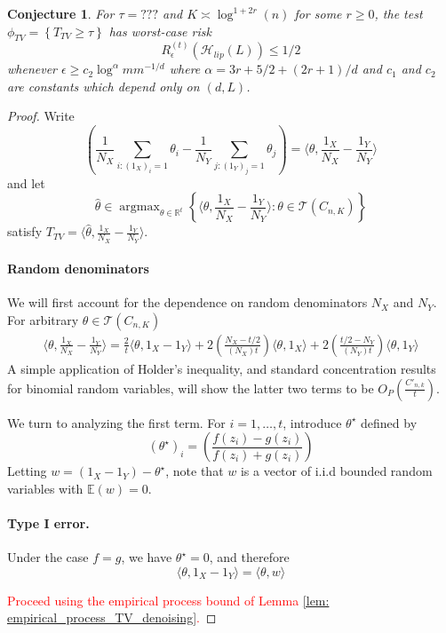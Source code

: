 \documentclass{article}
\newcommand{\Reals}{\mathbb{R}}
\newcommand{\set}[1]{\left\{#1\right\}}
\newcommand{\dotp}[2]{\langle #1, #2 \rangle}
\newcommand{\1}{\mathbb{I}}
\DeclareMathOperator*{\argmax}{argmax}
\newcommand{\Hclass}{\mathcal{H}}
\newcommand{\Ebb}{\mathbb{E}}
\theoremstyle{alden}
\theoremstyle{aldenthm}
\newtheorem{conjecture}{Conjecture}
\theoremstyle{definition}
\theoremstyle{remark}
\begin{document}
\begin{conjecture}
	For $\tau = ???$ and $K \asymp \log^{1 + 2r}(n)$ for some $r \geq 0$, the test $\phi_{TV} = \set{T_{TV} \geq \tau}$ has worst-case risk
	\begin{equation*}
	R_{\epsilon}^{(t)}(\Hclass_{lip}(L)) \leq 1/2
	\end{equation*}
	whenever $\epsilon \geq c_2 \log^{\alpha}m m^{-1/d}$ where $\alpha = 3r + 5/2 + (2r + 1)/d$ and $c_1$ and $c_2$ are constants which depend only on $(d,L)$.
\end{conjecture}
\begin{proof}
	Write
	\begin{equation*}
	\left(\frac{1}{N_X}\sum_{i: (1_X)_i = 1} \theta_i - \frac{1}{N_Y}\sum_{j:(1_Y)_j = 1} \theta_j\right) = \dotp{\theta}{\frac{1_X}{N_X} - \frac{1_Y}{N_Y}}
	\end{equation*}
	and let
	\begin{equation*}
	\widehat{\theta} \in \argmax_{\theta \in \Reals^{t}} \set{\dotp{\theta}{\frac{1_X}{N_X} - \frac{1_Y}{N_Y}}: \theta \in \mathcal{T}(C_{n,K})}
	\end{equation*}
	satisfy $T_{TV} = \dotp{\widehat{\theta}}{\frac{1_X}{N_X} - \frac{1_Y}{N_Y}}$. 
	
	\paragraph{Random denominators}
	
	We will first account for the dependence on random denominators $N_X$ and $N_Y$. For arbitrary $\theta \in \mathcal{T}(C_{n,K})$
	\begin{align*}
	\dotp{\theta}{\frac{1_X}{N_X} - \frac{1_Y}{N_Y}} = \frac{2}{t}\dotp{\theta}{1_X - 1_Y} + 2\left(\frac{N_X - t/2}{(N_X)t}\right) \dotp{\theta}{1_X} + 2\left(\frac{t/2 - N_Y}{(N_Y)t}\right) \dotp{\theta}{1_Y}
	\end{align*}
	A simple application of Holder's inequality, and standard concentration results for binomial random variables, will show the latter two terms to be $O_{P}\left(\frac{C'_{n,k}}{t}\right)$.
	
	We turn to analyzing the first term. For $i = 1, \ldots, t$, introduce $\theta^{\star}$ defined by
	\begin{equation*}
	(\theta^{\star})_i = \left(\frac{f(z_i) - g(z_i)}{f(z_i) + g(z_i)} \right)	\end{equation*}
	Letting $w = (1_X - 1_Y) - \theta^{\star}$, note that $w$ is a vector of i.i.d bounded random variables with $\Ebb(w) = 0$.
	
	\paragraph{Type I error.}
	Under the case $f = g$, we have $\theta^{\star} = 0$, and therefore
	\begin{equation*}
	\dotp{\theta}{1_X - 1_Y} = \dotp{\theta}{w}
	\end{equation*}
	
	\textcolor{red}{Proceed using the empirical process bound of Lemma \ref{lem: empirical_process_TV_denoising}.}
\end{proof}
\end{document}
